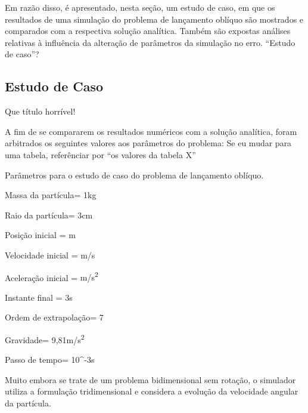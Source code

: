 Em razão disso, é apresentado, nesta seção, um estudo de caso, em que os resultados de uma simulação do problema de lançamento oblíquo são mostrados e comparados com a respectiva solução analítica. Também são expostas análises relativas à influência da alteração de parâmetros da simulação no erro.
\alert{``Estudo de caso''?}

\subsection{Estudo de Caso} \alert{Que título horrível!}

A fim de se compararem os resultados numéricos com a solução analítica, foram arbitrados os seguintes valores aos parâmetros do problema: \alert{Se eu mudar para uma tabela, referênciar por ``os valores da tabela X''}
\begin{table}[h]
\centering
\caption{Parâmetros para o \alert{estudo de caso} do problema de lançamento oblíquo.}
\label{tab:free_fall_case_parameters}
\begin{parametersdesc}
	\item{Massa da partícula}{\mass = 1}{\si\kilogram}
	\item{Raio da partícula}{\radius = 3}{\si\centi\metre}
	\item{Posição inicial}{\explicitVector{\initial{\positionx}}{\initial{\positiony}}{\initial{\positionz}} = }{\si{\metre}}
	\item{Velocidade inicial}{\explicitVector{\initial{\velocityx}}{\initial{\velocityy}}{\initial{\velocityz}} = }{\si[per-mode=symbol]{\metre\per\second}}
	\item{Aceleração inicial}{\explicitVector{\initial{\accelerationx}}{\initial{\accelerationy}}{\initial{\accelerationz}} = }{\si[per-mode=symbol]{\metre\per\square\second}}
	\item{Instante final}{ = 3}{\si\second} 
	\item{Ordem de extrapolação}{\taylorOrder = 7}{\emptyTableEntry}
	\item{Gravidade}{\gravityScalar = 9,81}{\si[per-mode=symbol]{\metre\per\square\second}}
	\item{Passo de tempo}{\Dt = 10^{-3}}{\si\second}
\end{parametersdesc}
\sourceMe 
\end{table}

Muito embora se trate de um problema bidimensional sem rotação, o simulador utiliza a formulação tridimensional e considera a evolução da velocidade angular da partícula.

